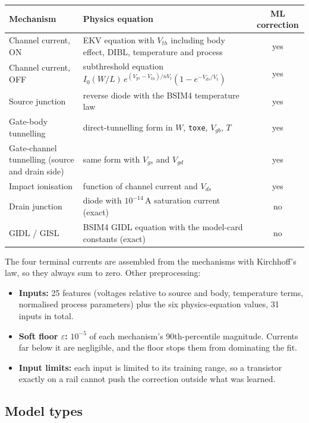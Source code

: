 \documentclass[10pt]{article}
\begin{document}
\begin{table}[H]
\centering
\small
\begin{tabularx}{\textwidth}{@{}p{4.3cm}Lc@{}}
\toprule
Mechanism & Physics equation & ML correction \\
\midrule
Channel current, ON & EKV equation with $V_{th}$ including body effect, DIBL, temperature and process & yes \\
Channel current, OFF & subthreshold equation $I_0 (W/L)\, e^{(V_{gs}-V_{th})/nV_t}(1-e^{-V_{ds}/V_t})$ & yes \\
Source junction & reverse diode with the BSIM4 temperature law & yes \\
Gate-body tunnelling & direct-tunnelling form in $W$, \texttt{toxe}, $V_{gb}$, $T$ & yes \\
Gate-channel tunnelling (source and drain side) & same form with $V_{gs}$ and $V_{gd}$ & yes \\
Impact ionisation & function of channel current and $V_{ds}$ & yes \\
Drain junction & diode with $10^{-14}$\,A saturation current (exact) & no \\
GIDL / GISL & BSIM4 GIDL equation with the model-card constants (exact) & no \\
\bottomrule
\end{tabularx}
\end{table}

The four terminal currents are assembled from the mechanisms with Kirchhoff's law, so they always
sum to zero. Other preprocessing:
\begin{itemize}
\item \textbf{Inputs:} 25 features (voltages relative to source and body, temperature terms,
normalised process parameters) plus the six physics-equation values, 31 inputs in total.
\item \textbf{Soft floor $\varepsilon$:} $10^{-5}$ of each mechanism's 90th-percentile magnitude.
Currents far below it are negligible, and the floor stops them from dominating the fit.
\item \textbf{Input limits:} each input is limited to its training range, so a transistor exactly
on a rail cannot push the correction outside what was learned.
\end{itemize}

\subsection*{Model types}
\end{document}

